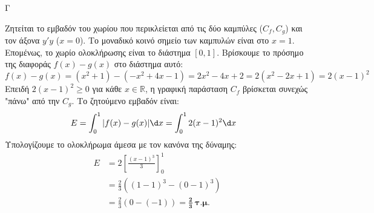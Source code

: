 \begin{thema}{Γ}
\begin{erwthma}
\item Ζητείται το εμβαδόν του χωρίου που περικλείεται από τις δύο καμπύλες ($C_f, C_g$) και τον άξονα $y'y$ ($x=0$).
Το μοναδικό κοινό σημείο των καμπυλών είναι στο $x=1$. Επομένως, το χωρίο ολοκλήρωσης είναι το διάστημα $[0, 1]$.
Βρίσκουμε το πρόσημο της διαφοράς $f(x) - g(x)$ στο διάστημα αυτό:
\[ f(x) - g(x) = (x^2 + 1) - (-x^2 + 4x - 1) = 2x^2 - 4x + 2 = 2(x^2 - 2x + 1) = 2(x - 1)^2 \]
Επειδή $2(x-1)^2 \ge 0$ για κάθε $x \in \mathbb{R}$, η γραφική παράσταση $C_f$ βρίσκεται συνεχώς "πάνω" από την $C_g$.
Το ζητούμενο εμβαδόν είναι:
\begin{align*}
E &= \int_{0}^{1} |f(x) - g(x)| \d x = \int_{0}^{1} 2(x - 1)^2 \d x
\end{align*}
Υπολογίζουμε το ολοκλήρωμα άμεσα με τον κανόνα της δύναμης:
\begin{align*}
E &= 2 \left[ \frac{(x - 1)^3}{3} \right]_0^1 \\
&= \frac{2}{3} \left( (1 - 1)^3 - (0 - 1)^3 \right) \\
&= \frac{2}{3} (0 - (-1)) = \boldsymbol{\frac{2}{3} \ \text{τ.μ.}}
\end{align*}
\end{erwthma}
\end{thema}

